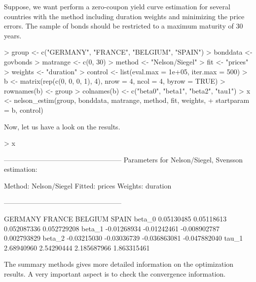 Suppose, we want perform a zero-coupon yield curve estimation for several countries with the \cite{Nelson1987} method including duration weights and minimizing the price errors. The sample of bonds should be restricted to a maximum maturity of 30 years. 

\begin{Schunk}
\begin{Sinput}
> group <- c("GERMANY", "FRANCE", "BELGIUM", "SPAIN")
> bonddata <- govbonds
> matrange <- c(0, 30)
> method <- "Nelson/Siegel"
> fit <- "prices"
> weights <- "duration"
> control <- list(eval.max = 1e+05, iter.max = 500)
> b <- matrix(rep(c(0, 0, 0, 1), 4), nrow = 4, ncol = 4, byrow = TRUE)
> rownames(b) <- group
> colnames(b) <- c("beta0", "beta1", "beta2", "tau1")
> x <- nelson_estim(group, bonddata, matrange, method, fit, weights, 
+     startparam = b, control)
\end{Sinput}
\end{Schunk}

Now, let us have a look on the results.

\begin{Schunk}
\begin{Sinput}
> x
\end{Sinput}
\begin{Soutput}
---------------------------------------------------
Parameters for Nelson/Siegel, Svensson estimation:

Method: Nelson/Siegel 
Fitted: prices 
Weights: duration 

---------------------------------------------------

           GERMANY      FRANCE      BELGIUM        SPAIN
beta_0  0.05130485  0.05118613  0.052087336  0.052729208
beta_1 -0.01268934 -0.01242461 -0.008902787  0.002793829
beta_2 -0.03215030 -0.03036739 -0.036863081 -0.047882040
tau_1   2.68940960  2.54290444  2.185687966  1.863315461
\end{Soutput}
\end{Schunk}

The summary methods gives more detailed information on the optimization results. A very important aspect is to check the convergence information.

